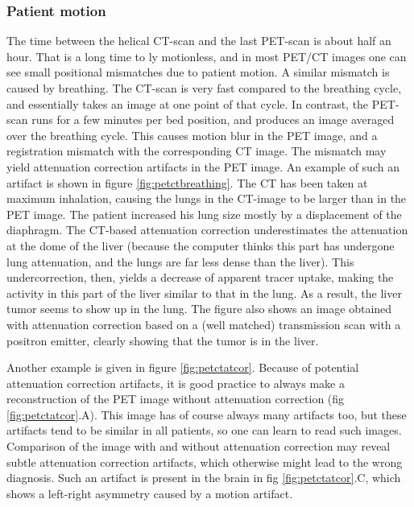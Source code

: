 \subsubsection{Patient motion}
The time between the helical CT-scan and the last PET-scan is about half an
hour. That is a long time to ly motionless, and in most PET/CT images one can
see small positional mismatches due to patient motion. A similar mismatch is
caused by breathing. The CT-scan is very fast compared to the breathing cycle,
and essentially takes an image at one point of that cycle. In contrast, the
PET-scan runs for a few minutes per bed position, and produces an image
averaged over the breathing cycle. This causes motion blur in the PET image,
and a registration mismatch with the corresponding CT image. The mismatch may
yield attenuation correction artifacts in the PET image. An example of such an
artifact is shown in figure \ref{fig:petctbreathing}. The CT has been taken at
maximum inhalation, causing the lungs in the CT-image to be larger than in the
PET image. The patient increased his lung size mostly by a displacement of the
diaphragm. The CT-based attenuation correction underestimates the attenuation
at the dome of the liver (because the computer thinks this part has undergone
lung attenuation, and the lungs are far less dense than the liver). This
undercorrection, then, yields a decrease of apparent tracer uptake, making the
activity in this part of the liver similar to that in the lung. As a result,
the liver tumor seems to show up in the lung. The figure also shows an image
obtained with attenuation correction based on a (well matched) transmission
scan with a positron emitter, clearly showing that the tumor is in the
liver.

Another example is given in figure \ref{fig:petctatcor}. Because of
potential attenuation correction artifacts, it is good practice to
always make a reconstruction of the PET image without attenuation
correction (fig \ref{fig:petctatcor}.A). This image has of course
always many artifacts too, but these artifacts tend to be similar in all
patients, so one can learn to read such images. Comparison of the
image with and without attenuation correction may reveal subtle
attenuation correction artifacts, which otherwise might lead to the
wrong diagnosis. Such an artifact is present in the brain in fig
\ref{fig:petctatcor}.C, which shows a left-right asymmetry caused by a
motion artifact.

